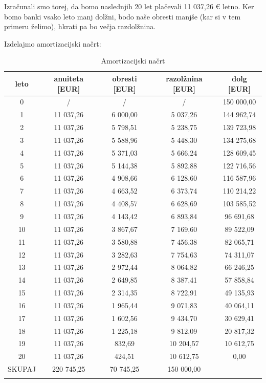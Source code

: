 \documentclass[12pt]{article}
\begin{document}
    Izračunali smo torej, da bomo naslednjih 20 let plačevali 11 037,26 € letno. Ker bomo
    banki vsako leto manj dolžni, bodo naše obresti manjše (kar si v tem primeru želimo),
    hkrati pa bo večja razdolžnina. 
    
    \newpage
    Izdelajmo amortizacijski načrt:
    \begin{longtable}{|c|c|c|c|c|}
        \hline
        \textbf{leto}   & \textbf{anuiteta [EUR]}  & \textbf{obresti [EUR]}  & \textbf{razolžnina [EUR]} & \textbf{dolg [EUR]} \\ \hline
        \endfirsthead
        \endhead
        0      & /          & /         & /          & 150 000,00 \\ \hline
        1      & 11 037,26  & 6 000,00  & 5 037,26   & 144 962,74 \\ \hline
        2      & 11 037,26  & 5 798,51  & 5 238,75   & 139 723,98 \\ \hline
        3      & 11 037,26  & 5 588,96  & 5 448,30   & 134 275,68 \\ \hline
        4      & 11 037,26  & 5 371,03  & 5 666,24   & 128 609,45 \\ \hline
        5      & 11 037,26  & 5 144,38  & 5 892,88   & 122 716,56 \\ \hline \hline 
        6      & 11 037,26  & 4 908,66  & 6 128,60   & 116 587,96 \\ \hline
        7      & 11 037,26  & 4 663,52  & 6 373,74   & 110 214,22 \\ \hline
        8      & 11 037,26  & 4 408,57  & 6 628,69   & 103 585,52 \\ \hline
        9      & 11 037,26  & 4 143,42  & 6 893,84   & 96 691,68  \\ \hline 
        10     & 11 037,26  & 3 867,67  & 7 169,60   & 89 522,09  \\ \hline \hline
        11     & 11 037,26  & 3 580,88  & 7 456,38   & 82 065,71  \\ \hline
        12     & 11 037,26  & 3 282,63  & 7 754,63   & 74 311,07  \\ \hline
        13     & 11 037,26  & 2 972,44  & 8 064,82   & 66 246,25  \\ \hline
        14     & 11 037,26  & 2 649,85  & 8 387,41   & 57 858,84  \\ \hline
        15     & 11 037,26  & 2 314,35  & 8 722,91   & 49 135,93  \\ \hline \hline
        16     & 11 037,26  & 1 965,44  & 9 071,83   & 40 064,11  \\ \hline
        17     & 11 037,26  & 1 602,56  & 9 434,70   & 30 629,41  \\ \hline
        18     & 11 037,26  & 1 225,18  & 9 812,09   & 20 817,32  \\ \hline
        19     & 11 037,26  & 832,69    & 10 204,57  & 10 612,75  \\ \hline
        20     & 11 037,26  & 424,51    & 10 612,75  & 0,00       \\ \hline \hline
        SKUPAJ & 220 745,25 & 70 745,25 & 150 000,00 &            \\ \hline
        \caption{Amortizacijski načrt}
    \end{longtable}
\end{document}
